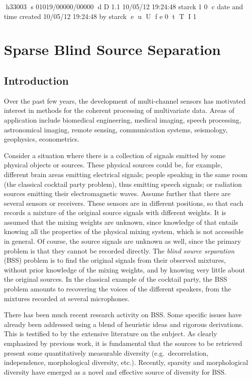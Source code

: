 h33003
s 01019/00000/00000
d D 1.1 10/05/12 19:24:48 starck 1 0
c date and time created 10/05/12 19:24:48 by starck
e
u
U
f e 0
t
T
I 1

\chapter{Sparse Blind Source Separation}
\minitoc 

\label{ch_gmca}

     
\section{Introduction}

Over the past few years, the development of multi-channel sensors has motivated interest in methods for the coherent processing of multivariate data. Areas of application include biomedical engineering, medical imaging, speech processing, astronomical imaging, remote sensing, communication systems, seismology, geophysics, econometrics.

Consider a situation where there is a collection of signals emitted by some physical objects or sources. These physical sources could be, for example, different brain areas emitting electrical signals; people speaking in the same room (the classical cocktail party problem), thus emitting speech signals; or radiation sources emitting their electromagnetic waves. Assume further that there are several sensors or receivers. These sensors are in different positions, so that each records a mixture of the original source signals with different weights. It is assumed that the mixing weights are unknown, since knowledge of that entails knowing all the properties of the physical mixing system, which is not accessible in general. Of course, the source signals are unknown as well, since the primary problem is that they cannot be recorded directly. The {\textit{blind source separation}} (BSS) problem is to find the original signals from their observed mixtures, without prior knowledge of the mixing weights, and by knowing very little about the original sources. In the classical example of the cocktail party, the BSS problem amounts to recovering the voices of the different speakers, from the mixtures recorded at several microphones. 

There has been much recent research activity on BSS. Some specific issues have already been addressed using a blend of heuristic ideas and rigorous derivations. This is testified to by the extensive literature on the subject. As clearly emphasized by previous work, it is fundamental that the sources to be retrieved present some quantitatively measurable diversity (e.g.\ decorrelation, independence, morphological diversity, etc.). Recently, sparsity and morphological diversity have emerged as a novel and effective source of diversity for BSS. 

